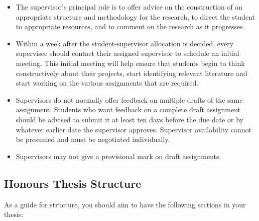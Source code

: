 \documentclass[a4paper,12pt]{article}
\begin{document}
\begin{itemize}
	\item The supervisor’s principal role is to offer advice on the construction of an appropriate structure and methodology for the research, to direct the student to appropriate resources, and to comment on the research as it progresses.
	\item Within a week after the student-supervisor allocation is decided, every supervisee should contact their assigned supervisor to schedule an initial meeting. This initial meeting will help ensure that students begin to think constructively about their projects, start identifying relevant literature and start working on the various assignments that are required.
	\item Supervisors do not normally offer feedback on multiple drafts of the same assignment. Students who want feedback on a complete draft assignment should be advised to submit it at least ten days before the due date or by whatever earlier date the supervisor approves. Supervisor availability cannot be presumed and must be negotiated individually.
	\item Supervisors may not give a provisional mark on draft assignments.
\end{itemize}

\subsection*{Honours Thesis Structure}

As a guide for structure, you should aim to have the following sections in your thesis:
\end{document}
